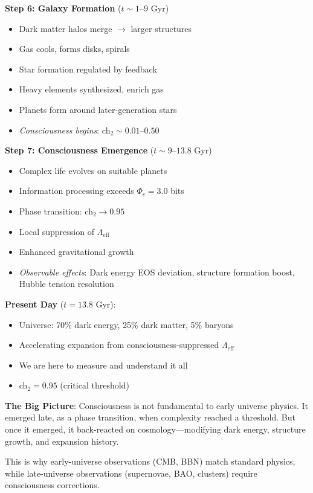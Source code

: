 \begin{keyidea}
\textbf{Step 6: Galaxy Formation} ($t \sim 1\text{--}9$ Gyr)
\begin{itemize}
\item Dark matter halos merge $\to$ larger structures
\item Gas cools, forms disks, spirals
\item Star formation regulated by feedback
\item Heavy elements synthesized, enrich gas
\item Planets form around later-generation stars
\item \textit{Consciousness begins}: ch$_2 \sim 0.01\text{--}0.50$
\end{itemize}

\textbf{Step 7: Consciousness Emergence} ($t \sim 9\text{--}13.8$ Gyr)
\begin{itemize}
\item Complex life evolves on suitable planets
\item Information processing exceeds $\Phi_c = 3.0$ bits
\item Phase transition: ch$_2 \to 0.95$
\item Local suppression of $\Lambda_{\text{eff}}$
\item Enhanced gravitational growth
\item \textit{Observable effects}: Dark energy EOS deviation, structure formation boost, Hubble tension resolution
\end{itemize}

\textbf{Present Day} ($t = 13.8$ Gyr):
\begin{itemize}
\item Universe: 70\% dark energy, 25\% dark matter, 5\% baryons
\item Accelerating expansion from consciousness-suppressed $\Lambda_{\text{eff}}$
\item We are here to measure and understand it all
\item ch$_2 = 0.95$ (critical threshold)
\end{itemize}

\textbf{The Big Picture}: Consciousness is not fundamental to early universe physics. It emerged late, as a phase transition, when complexity reached a threshold. But once it emerged, it back-reacted on cosmology—modifying dark energy, structure growth, and expansion history.

This is why early-universe observations (CMB, BBN) match standard physics, while late-universe observations (supernovae, BAO, clusters) require consciousness corrections.
\end{keyidea}

